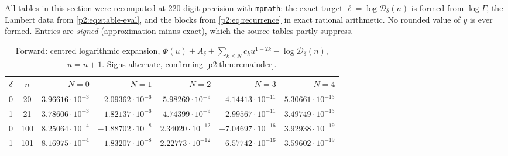 \documentclass[11pt,a4paper,oneside]{book}
\theoremstyle{plain}
\theoremstyle{definition}
\theoremstyle{remark}
\begin{document}
All tables in this section were recomputed at \(220\)-digit precision with
\texttt{mpmath}: the exact target \(\ell=\log\mathcal D_\delta(n)\) is formed
from \(\log\Gamma\), the Lambert data from \cref{p2:eq:stable-eval}, and the
blocks from \cref{p2:eq:recurrence} in exact rational arithmetic.  No rounded
value of \(y\) is ever formed.  Entries are \emph{signed}
(approximation minus exact), which the source tables partly suppress.

\begin{table}[htbp]
\centering\small
\caption{Forward: centred logarithmic expansion, \(\Phi(u)+A_\delta+
\sum_{k\le N}c_ku^{1-2k}-\log\mathcal D_\delta(n)\), \(u=n+1\).  Signs
alternate, confirming \cref{p2:thm:remainder}.}
\label{p2:tab:fwd-log}
\begin{tabular}{c c r r r r r}
\toprule
\(\delta\)&\(n\)&\(N=0\)&\(N=1\)&\(N=2\)&\(N=3\)&\(N=4\)\\
\midrule
0&20 & \(3.96616\cdot10^{-3}\) & \(-2.09362\cdot10^{-6}\)
    & \(5.98269\cdot10^{-9}\) & \(-4.14413\cdot10^{-11}\)
    & \(5.30661\cdot10^{-13}\)\\
1&21 & \(3.78606\cdot10^{-3}\) & \(-1.82137\cdot10^{-6}\)
    & \(4.74399\cdot10^{-9}\) & \(-2.99567\cdot10^{-11}\)
    & \(3.49749\cdot10^{-13}\)\\
0&100& \(8.25064\cdot10^{-4}\) & \(-1.88702\cdot10^{-8}\)
    & \(2.34020\cdot10^{-12}\) & \(-7.04697\cdot10^{-16}\)
    & \(3.92938\cdot10^{-19}\)\\
1&101& \(8.16975\cdot10^{-4}\) & \(-1.83207\cdot10^{-8}\)
    & \(2.22773\cdot10^{-12}\) & \(-6.57742\cdot10^{-16}\)
    & \(3.59602\cdot10^{-19}\)\\
\bottomrule
\end{tabular}
\end{table}
\end{document}
